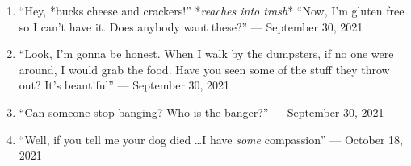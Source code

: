 \documentclass[12pt]{article}
\begin{document}
\begin{enumerate}
      \item “Hey, *bucks cheese and crackers!” *\textit{reaches into trash}* “Now, I'm gluten free so I can't have it. Does anybody want these?” — September 30, 2021

      \item “Look, I'm gonna be honest. When I walk by the dumpsters, if no one were around, I would grab the food. Have you seen some of the stuff they throw out? It's beautiful” — September 30, 2021

      \item “Can someone stop banging? Who is the banger?” — September 30, 2021

      \item “Well, if you tell me your dog died \dots I have \textit{some} compassion” — October 18, 2021

\end{enumerate}
\end{document}
